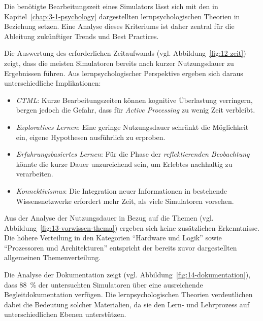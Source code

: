 Die benötigte Bearbeitungszeit eines Simulators lässt sich mit den in Kapitel~\ref{chap:3-1-psychology} dargestellten lernpsychologischen Theorien in Beziehung setzen. Eine Analyse dieses Kriteriums ist daher zentral für die Ableitung zukünftiger Trends und Best Practices. 

Die Auswertung des erforderlichen Zeitaufwands (vgl. Abbildung~\ref{fig:12-zeit}) zeigt, dass die meisten Simulatoren bereits nach kurzer Nutzungsdauer zu Ergebnissen führen. Aus lernpsychologischer Perspektive ergeben sich daraus unterschiedliche Implikationen:


\begin{itemize}
    \item \textit{\ac{CTML}}: Kurze Bearbeitungszeiten können kognitive Überlastung verringern, bergen jedoch die Gefahr, dass für \textit{Active Processing} zu wenig Zeit verbleibt.
    \item \textit{Exploratives Lernen}: Eine geringe Nutzungsdauer schränkt die Möglichkeit ein, eigene Hypothesen ausführlich zu erproben.
    \item \textit{Erfahrungsbasiertes Lernen}: Für die Phase der \textit{reflektierenden Beobachtung} könnte die kurze Dauer unzureichend sein, um Erlebtes nachhaltig zu verarbeiten.
    \item \textit{Konnektivismus}: Die Integration neuer Informationen in bestehende Wissensnetzwerke erfordert mehr Zeit, als viele Simulatoren vorsehen.
\end{itemize}

Aus der Analyse der Nutzungsdauer in Bezug auf die Themen (vgl. Abbildung~\ref{fig:13-vorwissen-thema}) ergeben sich keine zusätzlichen Erkenntnisse. Die höhere Verteilung in den Kategorien \enquote{Hardware und Logik} sowie \enquote{Prozessoren und Architekturen} entspricht der bereits zuvor dargestellten allgemeinen Themenverteilung.

Die Analyse der Dokumentation zeigt (vgl. Abbildung~\ref{fig:14-dokumentation}), dass 88~\% der untersuchten Simulatoren über eine ausreichende Begleitdokumentation verfügen. Die lernpsychologischen Theorien verdeutlichen dabei die Bedeutung solcher Materialien, da sie den Lern- und Lehrprozess auf unterschiedlichen Ebenen unterstützen.


